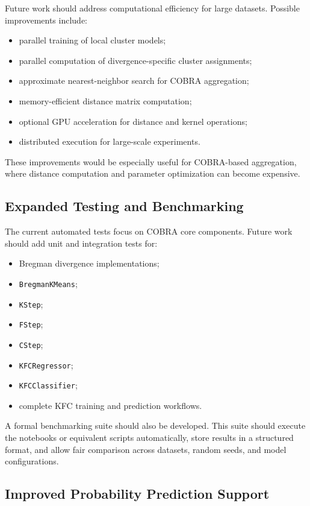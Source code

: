 Future work should address computational efficiency for large datasets. Possible improvements include:

\begin{itemize}
\item parallel training of local cluster models;
\item parallel computation of divergence-specific cluster assignments;
\item approximate nearest-neighbor search for COBRA aggregation;
\item memory-efficient distance matrix computation;
\item optional GPU acceleration for distance and kernel operations;
\item distributed execution for large-scale experiments.
\end{itemize}

These improvements would be especially useful for COBRA-based aggregation, where distance computation and parameter optimization can become expensive.

\subsection{Expanded Testing and Benchmarking}

The current automated tests focus on COBRA core components. Future work should add unit and integration tests for:

\begin{itemize}
\item Bregman divergence implementations;
\item \texttt{BregmanKMeans};
\item \texttt{KStep};
\item \texttt{FStep};
\item \texttt{CStep};
\item \texttt{KFCRegressor};
\item \texttt{KFCClassifier};
\item complete KFC training and prediction workflows.
\end{itemize}

A formal benchmarking suite should also be developed. This suite should execute the notebooks or equivalent scripts automatically, store results in a structured format, and allow fair comparison across datasets, random seeds, and model configurations.

\subsection{Improved Probability Prediction Support}

